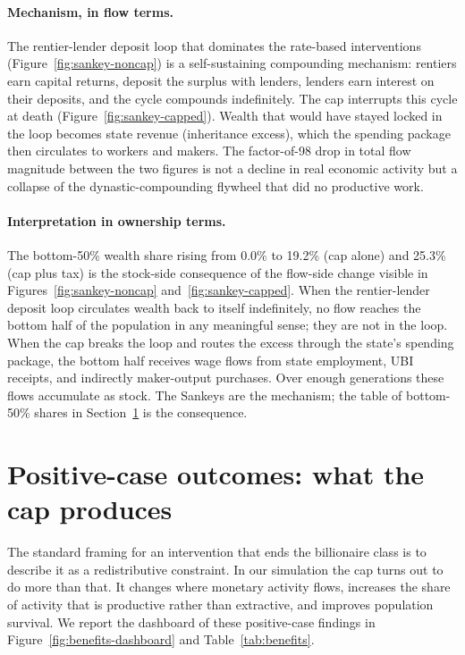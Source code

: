 \documentclass[11pt]{article}
\begin{document}
\paragraph{Mechanism, in flow terms.}  The rentier-lender deposit
loop that dominates the rate-based interventions
(Figure~\ref{fig:sankey-noncap}) is a self-sustaining compounding
mechanism: rentiers earn capital returns, deposit the surplus
with lenders, lenders earn interest on their deposits, and the
cycle compounds indefinitely.  The cap interrupts this cycle at
death (Figure~\ref{fig:sankey-capped}).  Wealth that would have
stayed locked in the loop becomes state revenue (inheritance
excess), which the spending package then circulates to workers
and makers.  The factor-of-98 drop in total flow magnitude
between the two figures is not a decline in real economic
activity but a collapse of the dynastic-compounding flywheel
that did no productive work.

\paragraph{Interpretation in ownership terms.}  The bottom-50\%
wealth share rising from 0.0\% to 19.2\% (cap alone) and 25.3\%
(cap plus tax) is the stock-side consequence of the flow-side
change visible in Figures~\ref{fig:sankey-noncap}
and~\ref{fig:sankey-capped}.  When the rentier-lender deposit
loop circulates wealth back to itself indefinitely, no flow
reaches the bottom half of the population in any meaningful
sense; they are not in the loop.  When the cap breaks the loop
and routes the excess through the state's spending package, the
bottom half receives wage flows from state employment, UBI
receipts, and indirectly maker-output purchases.  Over enough
generations these flows accumulate as stock.  The Sankeys are the
mechanism; the table of bottom-50\% shares in
Section~\ref{sec:benefits} is the consequence.

\section{Positive-case outcomes: what the cap produces}
\label{sec:benefits}

The standard framing for an intervention that ends the billionaire
class is to describe it as a redistributive constraint.  In our
simulation the cap turns out to do more than that.  It changes
where monetary activity flows, increases the share of activity
that is productive rather than extractive, and improves population
survival.  We report the dashboard of these positive-case findings
in Figure~\ref{fig:benefits-dashboard} and Table~\ref{tab:benefits}.
\end{document}
